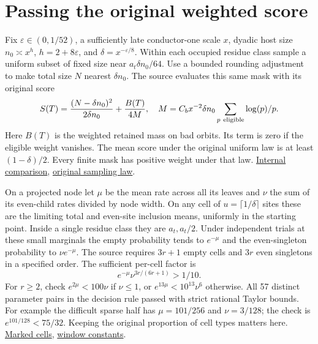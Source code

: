 \documentclass[12pt,letterpaper]{article}
\newcommand{\orig}[3]{\href{https://github.com/nousentllc/riemann-hypothesis/blob/40e56bab026552e089d7afcfeff08d2defb9c005/src/#1.lean\#L#2}{#3}}
\newcommand{\pagepart}[1]{\clearpage\section{#1}}
\begin{document}
\pagepart{Passing the original weighted score}
Fix \(\varepsilon\in(0,1/52)\), a sufficiently late conductor-one scale \(x\), dyadic host size \(n_0\asymp x^h\), \(h=2+8\varepsilon\), and \(\delta=x^{-\varepsilon/8}\). Within each occupied residue class sample a uniform subset of fixed size near \(a_t\delta n_0/64\). Use a bounded rounding adjustment to make total size \(N\) nearest \(\delta n_0\). The source evaluates this same mask with its original score
\[
 S(T)=\frac{(N-\delta n_0)^2}{2\delta n_0}+\frac{B(T)}{4M},
 \quad M=C_b x^{-2}\delta n_0\sum_{p\ {\rm eligible}}\log(p)/p.
\]
Here \(B(T)\) is the weighted retained mass on bad orbits. Its term is zero if the eligible weight vanishes. The mean score under the original uniform law is at least \((1-\delta)/2\). Every finite mask has positive weight under that law. \orig{Development/AutomorphicArithmetic/ThickFrames/select}{136}{Internal comparison}, \orig{Development/AutomorphicArithmetic/ThickFrames/topsGroup}{101}{original sampling law}.

On a projected node let \(\mu\) be the mean rate across all its leaves and \(\nu\) the sum of its even-child rates divided by node width. On any cell of \(u=\lceil1/\delta\rceil\) sites these are the limiting total and even-site inclusion means, uniformly in the starting point. Inside a single residue class they are \(a_t,a_t/2\). Under independent trials at these small marginals the empty probability tends to \(e^{-\mu}\) and the even-singleton probability to \(\nu e^{-\mu}\). The source requires \(3r+1\) empty cells and \(3r\) even singletons in a specified order. The sufficient per-cell factor is
\[
                  e^{-\mu}\nu^{3r/(6r+1)}>1/10.
\]
For \(r\ge2\), check \(e^{2\mu}<100\nu\) if \(\nu\le1\), or \(e^{13\mu}<10^{13}\nu^6\) otherwise. All 57 distinct parameter pairs in the decision rule passed with strict rational Taylor bounds. For example the difficult sparse half has \(\mu=101/256\) and \(\nu=3/128\); the check is \(e^{101/128}<75/32\). Keeping the original proportion of cell types matters here. \orig{Formalism/SubspaceCounting/GoodOrbitIntervalTileCondition}{12}{Marked cells}, \orig{Formalism/SharpRestriction/GrowthBounds/UnramifiedQuadraticSetting}{237}{window constants}.
\end{document}
